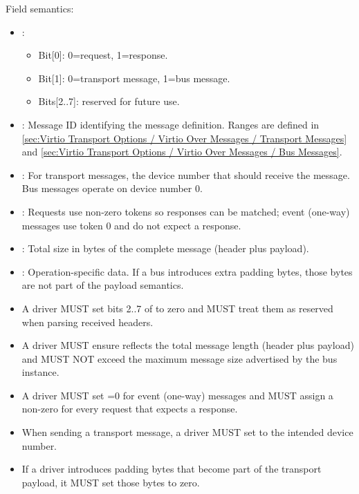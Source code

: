 Field semantics:
\begin{itemize}
  \item {}:
    \begin{itemize}
  \item Bit[0]: 0=request, 1=response.
  \item Bit[1]: 0=transport message, 1=bus message.
  \item Bits[2..7]: reserved for future use.
    \end{itemize}
  \item {}: Message ID identifying the message definition. Ranges
    are defined in
    \ref{sec:Virtio Transport Options / Virtio Over Messages / Transport Messages}
    and
    \ref{sec:Virtio Transport Options / Virtio Over Messages / Bus Messages}.
  \item {}: For transport messages, the device number that should
    receive the message. Bus messages operate on device number 0.
  \item {}: Requests use non-zero tokens so responses can be matched;
    event (one-way) messages use token 0 and do not expect a response.
  \item {}: Total size in bytes of the complete message (header
    plus payload).
  \item {}: Operation-specific data. If a bus introduces extra
    padding bytes, those bytes are not part of the payload semantics.
\end{itemize}

\begin{itemize}
  \item A driver MUST set bits 2..7 of  to zero and MUST treat them as reserved when
        parsing received headers.
  \item A driver MUST ensure  reflects the total message length (header plus payload)
        and MUST NOT exceed the maximum message size advertised by the bus instance.
  \item A driver MUST set =0 for event (one-way) messages and MUST assign a non-zero
         for every request that expects a response.
  \item When sending a transport message, a driver MUST set  to the intended device
        number.
  \item If a driver introduces padding bytes that become part of the transport payload, it MUST set
        those bytes to zero.
\end{itemize}

